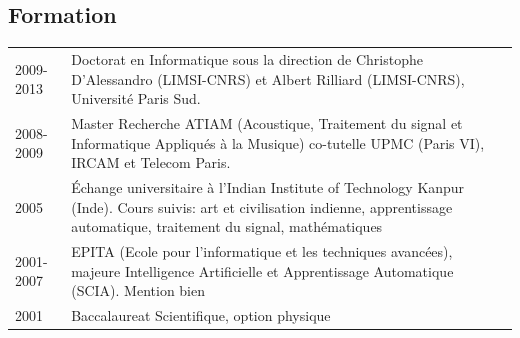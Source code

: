 \begin{fr}
\section{Formation}
\begin{tabularx}{\linewidth}{@{}l X@{}}	
2009-2013 & Doctorat en Informatique sous la direction de Christophe D’Alessandro (LIMSI-CNRS) et Albert Rilliard (LIMSI-CNRS), Université Paris Sud.\\
2008-2009 & Master Recherche ATIAM (Acoustique, Traitement du signal et Informatique Appliqués à la Musique) co-tutelle UPMC (Paris VI), IRCAM et Telecom Paris.\\
2005 & \'Echange universitaire à l'Indian Institute of Technology Kanpur (Inde). Cours suivis: art et civilisation indienne, apprentissage automatique, traitement du signal, mathématiques\\
2001-2007 & EPITA (Ecole pour l'informatique et les techniques avancées), majeure Intelligence Artificielle et Apprentissage Automatique (SCIA). Mention bien\\
2001 & Baccalaureat Scientifique, option physique\\
\end{tabularx}
\end{fr}


